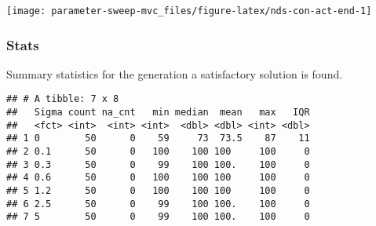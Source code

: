 \documentclass[]{book}
\newenvironment{Shaded}{\begin{snugshade}}{\end{snugshade}}
\newcommand{\DataTypeTok}[1]{\textcolor[rgb]{0.13,0.29,0.53}{#1}}
\newcommand{\DecValTok}[1]{\textcolor[rgb]{0.00,0.00,0.81}{#1}}
\newcommand{\KeywordTok}[1]{\textcolor[rgb]{0.13,0.29,0.53}{\textbf{#1}}}
\newcommand{\NormalTok}[1]{#1}
\newcommand{\OperatorTok}[1]{\textcolor[rgb]{0.81,0.36,0.00}{\textbf{#1}}}
\newcommand{\OtherTok}[1]{\textcolor[rgb]{0.56,0.35,0.01}{#1}}
\newcommand{\StringTok}[1]{\textcolor[rgb]{0.31,0.60,0.02}{#1}}
\begin{document}
\texttt{[image: parameter-sweep-mvc\_files/figure-latex/nds-con-act-end-1]}

\hypertarget{stats-44}{%
\subsubsection{Stats}\label{stats-44}}

Summary statistics for the generation a satisfactory solution is found.

\begin{Shaded}
\end{Shaded}

\begin{verbatim}
## # A tibble: 7 x 8
##   Sigma count na_cnt   min median  mean   max   IQR
##   <fct> <int>  <int> <int>  <dbl> <dbl> <int> <dbl>
## 1 0        50      0    59     73  73.5    87    11
## 2 0.1      50      0   100    100 100     100     0
## 3 0.3      50      0    99    100 100.    100     0
## 4 0.6      50      0   100    100 100     100     0
## 5 1.2      50      0   100    100 100     100     0
## 6 2.5      50      0    99    100 100.    100     0
## 7 5        50      0    99    100 100.    100     0
\end{verbatim}
\end{document}
